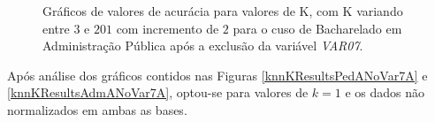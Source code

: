 \begin{figure}[!htb]
  \centering
  \caption{\label{knnResultsAdmNoVar7} Gráficos de valores de acurácia para valores de K, com K variando entre \(3\) e \(201\) com incremento de \(2\) para o cuso de Bacharelado em Administração Pública após a exclusão da variável \textit{VAR07}.}
  \qquad
  \vspace{1.5em}
  \Ididthis
\end{figure}

Após análise dos gráficos contidos nas Figuras \ref{knnKResultsPedANoVar7A} e
\ref{knnKResultsAdmANoVar7A}, optou-se para valores de \(k = 1\) e os dados não
normalizados em ambas as bases.

